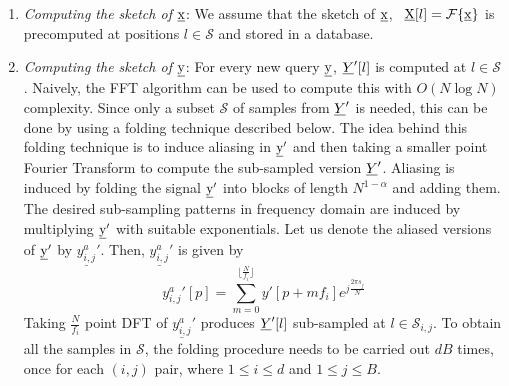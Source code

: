 \begin{enumerate}
	\item[\RNum{1}] \textit{Computing the sketch of $\underline{\mathrm{x}}$}: 
	 We assume that the sketch of $\underline{\mathrm{x}}$, \ $ \underline{\mathrm{X}}[l] = \mathcal{F}\{\underline{\mathrm{x}}\}$ is precomputed at positions $l \in \mathcal{S}$ and stored in a database.  
	\item[\RNum{2}] \textit{Computing the sketch of $\underline{\mathrm{y}}$}:
	 For every new query $\underline{\mathrm{y}}$, $ \underline{Y}'[l]$ is computed at $l \in \mathcal{S}$. Naively, the FFT algorithm can be used to compute this with $O(N \log N)$ complexity. Since only a subset $\mathcal{S}$ of samples from $\underline{Y}'$ is needed, this can be done by using a folding technique described below. 
	  The idea behind this folding technique is to induce aliasing in $\underline{\mathrm{y}}'$ and then taking a smaller point Fourier Transform to compute the sub-sampled version $\underline{Y}'$. Aliasing is induced by folding the signal $\underline{\mathrm{y}}'$ into blocks of length $N^{1-\alpha}$ and adding them. The desired sub-sampling patterns in frequency domain are induced by multiplying $\underline{\mathrm{y}}'$ with suitable exponentials. Let us denote the aliased versions of $\underline{\mathrm{y}}'$ by $\underline{y^{a}_{i,j}}'$. Then, $\underline{y^{a}_{i,j}}'$ is given by
	  \begin{equation}
	  	{y^{a}_{i,j}}'[p] = \sum \limits_{m = 0}^{\lfloor{\frac{N}{f_i}}\rfloor} y'[p + mf_i] e^{j \frac{2 \pi s_j}{N} } 
	  \end{equation}
	  Taking $\frac{N}{f_i}$ point DFT of $\underline{y^{a}_{i,j}}'$ produces $\underline{Y}'[l]$ sub-sampled at $l \in \mathcal{S}_{i,j}$. To obtain all the samples in $\mathcal{S}$, the folding procedure needs to be carried out $dB$ times, once for each $(i,j)$ pair, where $1 \leq i \leq d $ and  $1 \leq j \leq B $.  
\end{enumerate}
